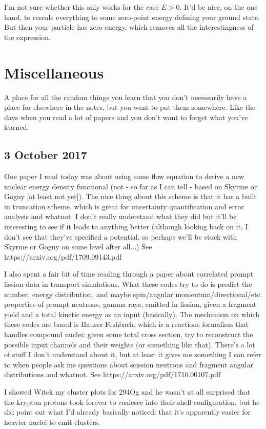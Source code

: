 \documentclass[]{report}
\begin{document}
I'm not sure whether this only works for the case $E>0$. It'd be nice, on the one hand, to rescale everything to some zero-point energy defining your ground state. But then your particle has zero energy, which removes all the interestingness of the expression.

\section*{Miscellaneous}
A place for all the random things you learn that you don't necessarily have a place for elsewhere in the notes, but you want to put them somewhere. Like the days when you read a lot of papers and you don't want to forget what you've learned.

\subsection*{3 October 2017}
One paper I read today was about using some flow equation to derive a new nuclear energy density functional (not - so far as I can tell - based on Skyrme or Gogny [at least not yet]). The nice thing about this scheme is that it has a built in truncation scheme, which is great for uncertainty quantification and error analysis and whatnot. I don't really understand what they did but it'll be interesting to see if it leads to anything better (although looking back on it, I don't see that they've specified a potential, so perhaps we'll be stuck with Skyrme or Gogny on some level after all...) See https://arxiv.org/pdf/1709.09143.pdf

I also spent a fair bit of time reading through a paper about correlated prompt fission data in transport simulations. What these codes try to do is predict the number, energy distribution, and maybe spin/angular momentum/directional/etc. properties of prompt neutrons, gamma rays, emitted in fission, given a fragment yield and a total kinetic energy as an input (basically). The mechanism on which these codes are based is Hauser-Feshbach, which is a reactions formalism that handles compound nuclei: given some total cross section, try to reconstruct the possible input channels and their weights (or something like that). There's a lot of stuff I don't understand about it, but at least it gives me something I can refer to when people ask me questions about scission neutrons and fragment angular distributions and whatnot. See https://arxiv.org/pdf/1710.00107.pdf

I showed Witek my cluster plots for 294Og and he wasn't at all surprised that the krypton protons took forever to coalesce into their shell configuration, but he did point out what I'd already basically noticed: that it's apparently easier for heavier nuclei to emit clusters.
\end{document}
